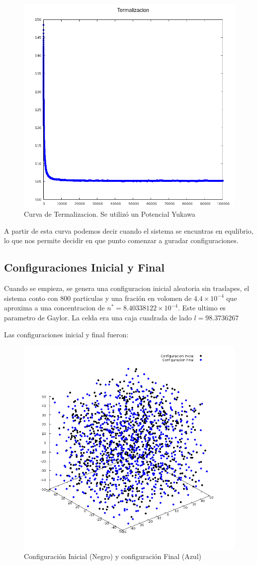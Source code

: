 \documentclass[12pt,letterpaper]{article}
\begin{document}
\begin{figure}[H]
	\centering
	\includegraphics[width=0.75\linewidth]{Termalizacion.png}
	\caption{Curva de Termalizacion. Se utilizó un Potencial Yukawa}
	\label{CurvaTerma}
\end{figure}
A partir de esta curva podemos decir cuando el sistema se encuntras en equlibrio, lo que nos permite decidir en que punto comenzar a guradar configuraciones.

\subsection*{Configuraciones Inicial y Final}

Cuando se empieza, se genera una configuracion inicial aleatoria sin traslapes, el sistema conto con 800 particulas y una fración en volomen de $4.4\times 10^{-4}$ que aproxima a una concentracion de  $n^* = 8.40338122\times 10^{-4}$. Este ultimo es parametro de Gaylor. La celda era una caja cuadrada de lado $l=98.3736267$

Las configuraciones inicial y final fueron:
\begin{figure}[H]
	\centering
	\includegraphics[width=0.75\linewidth]{Configuraciones.png}
	\caption{Configuración Inicial (Negro) y configuración Final (Azul)}
	\label{Configs}
\end{figure}
\end{document}
